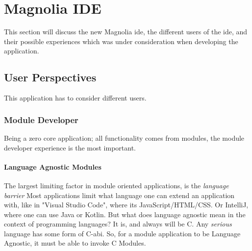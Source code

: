 \chapter{Magnolia IDE} \label{cha:ide}

This section will discuss the new Magnolia \gls{ide}, the different users of the
\gls{ide}, and their possible experiences which was under consideration when
developing the application.

\section{User Perspectives}

This application has to consider different users.

\subsection{Module Developer}

Being a zero core application; all functionality comes from modules, the module
developer experience is the most important.

\subsubsection{Language Agnostic Modules}

The largest limiting factor in module oriented applications, is the
\textit{language barrier} Most applications limit what language one can extend
an application with, like in "Visual Studio Code", where its
JavaScript/HTML/CSS. Or IntelliJ, where one can use Java or Kotlin. But what
does language agnostic mean in the context of programming languages? It is, and
always will be C. Any \textit{serious} language has some form of C-\gls{abi}.
So, for a module application to be Language Agnostic, it must be able to invoke
C Modules.

\begin{figure}
  \begin{center}
    
  \end{center}
  \label{fig:fm1}
\end{figure}

\begin{figure}
  \begin{center}
    
  \end{center}
  \label{fig:fm2}
\end{figure}

